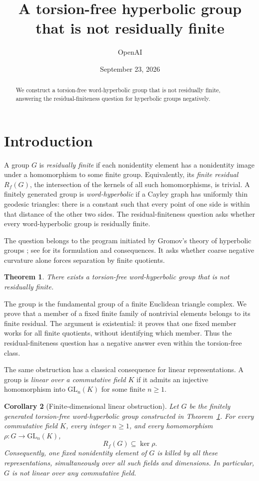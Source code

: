 \documentclass[11pt]{article}
\title{A torsion-free hyperbolic group that is not residually finite}
\author{OpenAI}
\date{September 23, 2026}
\newtheorem{theorem}{Theorem}[section]
\newtheorem{corollary}[theorem]{Corollary}
\theoremstyle{remark}
\numberwithin{equation}{section}
\begin{document}
\maketitle
\begin{abstract}
We construct a torsion-free word-hyperbolic group that is not residually finite, answering the residual-finiteness question for hyperbolic groups negatively.
\end{abstract}

\section{Introduction}\label{sec:introduction}

A group $G$ is \emph{residually finite} if each nonidentity element has a nonidentity image under a homomorphism to some finite group. Equivalently, its \emph{finite residual} $R_f(G)$, the intersection of the kernels of all such homomorphisms, is trivial. A finitely generated group is \emph{word-hyperbolic} if a Cayley graph has uniformly thin geodesic triangles: there is a constant such that every point of one side is within that distance of the other two sides. The residual-finiteness question asks whether every word-hyperbolic group is residually finite.

The question belongs to the program initiated by Gromov's theory of hyperbolic groups \cite{Gromov1987}; see \cite[\S5]{AGM2009} for its formulation and consequences. It asks whether coarse negative curvature alone forces separation by finite quotients.

\begin{theorem}\label{thm:main}
There exists a torsion-free word-hyperbolic group that is not residually finite.
\end{theorem}

The group is the fundamental group of a finite Euclidean triangle complex. We prove that a member of a fixed finite family of nontrivial elements belongs to its finite residual. The argument is existential: it proves that one fixed member works for all finite quotients, without identifying which member. Thus the residual-finiteness question has a negative answer even within the torsion-free class.

The same obstruction has a classical consequence for linear representations. A group is \emph{linear over a commutative field $K$} if it admits an injective homomorphism into $\mathrm{GL}_n(K)$ for some finite $n\geq 1$.

\begin{corollary}[Finite-dimensional linear obstruction]\label{cor:nonlinear}
Let $G$ be the finitely generated torsion-free word-hyperbolic group constructed in Theorem~\ref{thm:main}. For every commutative field $K$, every integer $n\geq 1$, and every homomorphism $\rho:G\to\mathrm{GL}_n(K)$,
\[
R_f(G)\subseteq\ker\rho.
\]
Consequently, one fixed nonidentity element of $G$ is killed by all these representations, simultaneously over all such fields and dimensions. In particular, $G$ is not linear over any commutative field.
\end{corollary}
\end{document}

